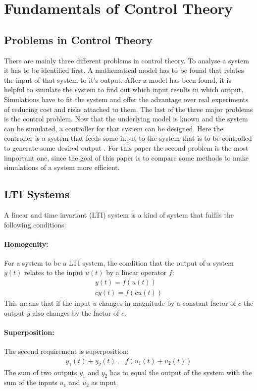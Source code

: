 \section{Fundamentals of Control Theory}

\subsection{Problems in Control Theory}
There are mainly three different problems in control theory.
To analyse a system it has to be identified first.
A mathematical model has to be found that relates the input of that system to it's output.
After a model has been found, it is helpful to simulate the system to find out which input results in which output.
Simulations have to fit the system and offer the advantage over real experiments of reducing cost and risks attached to them.
The last of the three major problems is the control problem.
Now that the underlying model is known and the system can be simulated, a controller for that system can be designed.
Here the controller is a system that feeds some input to the system that is to be controlled to generate some desired output \cite{DouglasBa}.
For this paper the second problem is the most important one, since the goal of this paper is to compare some methods to make simulations of a system more efficient.
\subsection{LTI Systems}
A linear and time invariant (LTI) system is a kind of system that fulfils the following conditions:
\paragraph{Homogenity:}
For a system to be a LTI system, the condition that the output of a system \(y(t)\) relates to the input \(u(t)\) by a linear operator \(f\):
\begin{gather}
y(t) = f(u(t)) \\
cy(t) = f(cu(t))
\end{gather}
This means that if the input \(u\) changes in magnitude by a constant factor of \(c\) the output \(y\) also changes by the factor of \(c\).
\paragraph{Superposition:}
The second requirement is superposition:
\begin{gather}
y_1(t) + y_2(t) = f(u_1(t) + u_2(t))
\end{gather}
The sum of two outputs \(y_1\) and \(y_2\) has to equal the output of the system with the sum of the inputs \(u_1\) and \(u_2\) as input.
